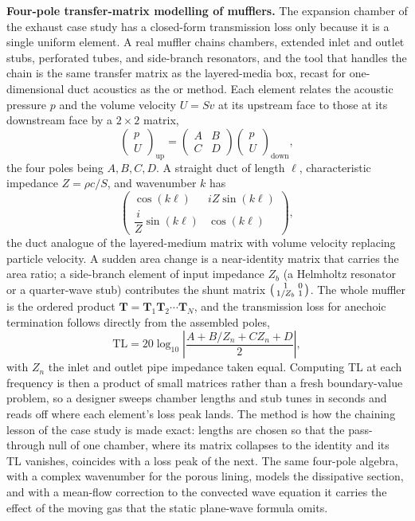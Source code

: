 \begin{mastery}
\textbf{Four-pole transfer-matrix modelling of mufflers.} The expansion
chamber of the exhaust case study has a closed-form transmission loss only
because it is a single uniform element. A real muffler chains chambers,
extended inlet and outlet stubs, perforated tubes, and side-branch
resonators, and the tool that handles the chain is the same transfer matrix
as the layered-media box, recast for one-dimensional duct acoustics as the
 or  method. Each element
relates the acoustic pressure $p$ and the volume velocity $U=Sv$ at its
upstream face to those at its downstream face by a $2\times 2$ matrix,
\[
\begin{pmatrix} p \\ U \end{pmatrix}_{\text{up}}
=
\begin{pmatrix} A & B \\ C & D \end{pmatrix}
\begin{pmatrix} p \\ U \end{pmatrix}_{\text{down}} ,
\]
the four poles being $A,B,C,D$. A straight duct of length $\ell$,
characteristic impedance $Z=\rho c/S$, and wavenumber $k$ has
\[
\begin{pmatrix} \cos(k\ell) & iZ\sin(k\ell) \\[2pt]
\dfrac{i}{Z}\sin(k\ell) & \cos(k\ell)\end{pmatrix},
\]
the duct analogue of the layered-medium matrix with volume velocity
replacing particle velocity. A sudden area change is a near-identity matrix
that carries the area ratio; a side-branch element of input impedance
$Z_b$ (a Helmholtz resonator or a quarter-wave stub) contributes the shunt
matrix $\begin{psmallmatrix} 1 & 0 \\ 1/Z_b & 1\end{psmallmatrix}$. The
whole muffler is the ordered product
$\mathbf{T}=\mathbf{T}_1\mathbf{T}_2\cdots\mathbf{T}_N$, and the
transmission loss for anechoic termination follows directly from the
assembled poles,
\[
\text{TL} = 20\log_{10}\!\left|\frac{A + B/Z_n + C Z_n + D}{2}\right|,
\]
with $Z_n$ the inlet and outlet pipe impedance taken equal. Computing TL at
each frequency is then a product of small matrices rather than a fresh
boundary-value problem, so a designer sweeps chamber lengths and stub tunes
in seconds and reads off where each element's loss peak lands. The method
is how the chaining lesson of the case study is made exact: lengths are
chosen so that the pass-through null of one chamber, where its matrix
collapses to the identity and its TL vanishes, coincides with a loss peak
of the next. The same four-pole algebra, with a complex wavenumber for the
porous lining, models the dissipative section, and with a mean-flow
correction to the convected wave equation it carries the effect of the
moving gas that the static plane-wave formula omits.
\end{mastery}

